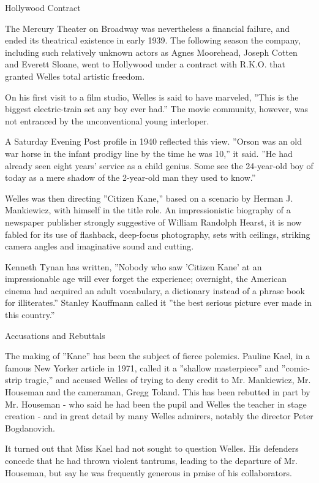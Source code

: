 Hollywood Contract

The Mercury Theater on Broadway was nevertheless a financial failure,
and ended its theatrical existence in early 1939. The following season
the company, including such relatively unknown actors as Agnes
Moorehead, Joseph Cotten and Everett Sloane, went to Hollywood under a
contract with R.K.O. that granted Welles total artistic freedom.

On his first visit to a film studio, Welles is said to have marveled,
''This is the biggest electric-train set any boy ever had.'' The movie
community, however, was not entranced by the unconventional young
interloper.

A Saturday Evening Post profile in 1940 reflected this view. ''Orson was
an old war horse in the infant prodigy line by the time he was 10,'' it
said. ''He had already seen eight years' service as a child genius. Some
see the 24-year-old boy of today as a mere shadow of the 2-year-old man
they used to know.''

Welles was then directing ''Citizen Kane,'' based on a scenario by
Herman J. Mankiewicz, with himself in the title role. An impressionistic
biography of a newspaper publisher strongly suggestive of William
Randolph Hearst, it is now fabled for its use of flashback, deep-focus
photography, sets with ceilings, striking camera angles and imaginative
sound and cutting.

Kenneth Tynan has written, ''Nobody who saw 'Citizen Kane' at an
impressionable age will ever forget the experience; overnight, the
American cinema had acquired an adult vocabulary, a dictionary instead
of a phrase book for illiterates.'' Stanley Kauffmann called it ''the
best serious picture ever made in this country.''

Accusations and Rebuttals

The making of ''Kane'' has been the subject of fierce polemics. Pauline
Kael, in a famous New Yorker article in 1971, called it a ''shallow
masterpiece'' and ''comic-strip tragic,'' and accused Welles of trying
to deny credit to Mr. Mankiewicz, Mr. Houseman and the cameraman, Gregg
Toland. This has been rebutted in part by Mr. Houseman - who said he had
been the pupil and Welles the teacher in stage creation - and in great
detail by many Welles admirers, notably the director Peter Bogdanovich.

It turned out that Miss Kael had not sought to question Welles. His
defenders concede that he had thrown violent tantrums, leading to the
departure of Mr. Houseman, but say he was frequently generous in praise
of his collaborators.

